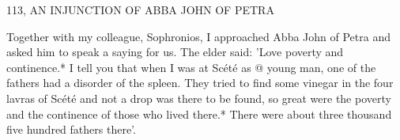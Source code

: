 113, AN INJUNCTION OF ABBA JOHN OF PETRA

Together with my colleague, Sophronios, I approached Abba John
of Petra and asked him to speak a saying for us. The elder said:
'Love poverty and continence.* I tell you that when I was at Scété
as @ young man, one of the fathers had a disorder of the spleen.
They tried to find some vinegar in the four lavras of Scété and not
a drop was there to be found, so great were the poverty and the
continence of those who lived there.* There were about three
thousand five hundred fathers there'.

